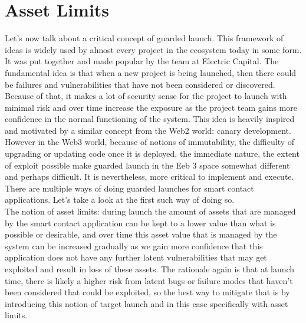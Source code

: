 \section{Asset Limits}
Let's now talk about a critical concept of guarded launch. This framework of ideas is widely used by almost every project in the ecosystem today in some form. It was put together and made popular by the team at Electric Capital. The fundamental idea is that when a new project is being launched, then there could be failures and vulnerabilities that have not been considered or discovered. Because of that, it makes a lot of security sense for the project to launch with minimal risk and over time increase the exposure as the project team gains more confidence in the normal functioning of the system. This idea is heavily inspired and motivated by a similar concept from the Web2 world: canary development. However in the Web3 world, because of notions of immutability, the difficulty of upgrading or updating code once it is deployed, the immediate nature, the extent of exploit possible make guarded launch in the Eeb 3 space somewhat different and perhaps difficult. It is nevertheless, more critical to implement and execute. There are multiple ways of doing guarded launches for smart contact applications. Let's take a look at the first such way of doing so.\\

The notion of asset limits: during launch the amount of assets that are managed by the smart contact application can be kept to a lower value than what is possible or desirable, and over time this asset value that is managed by the system can be increased gradually as we gain more confidence that this application does not have any further latent vulnerabilities that may get exploited and result in loss of these assets. The rationale again is that at launch time, there is likely a higher risk from latent bugs or failure modes that haven't been considered that could be exploited, so the best way to mitigate that is by introducing this notion of target launch and in this case specifically with asset limits.

